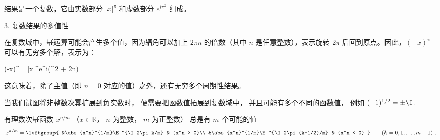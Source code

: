 结果是一个复数，它由实数部分 $|x|^\pi$ 和虚数部分 $e^{i\pi^2}$ 组成。

3. 复数结果的多值性

在复数域中，幂运算可能会产生多个值，因为辐角可以加上 $2\pi n$ 的倍数（其中 $n$ 是任意整数），表示旋转 $2\pi$ 后回到原点。因此，$(-x)^\pi$ 可以有无穷多个解，表示为：

(-x)^\pi = |x|^\pi \cdot e^{i(\pi^2 + 2n\pi)}

这意味着，除了主值（即 $n = 0$ 对应的值）之外，还有无穷多个周期性结果。



当我们试图将非整数次幂扩展到负实数时， 便需要把函数值拓展到复数域中， 并且可能有多个不同的函数值， 例如 $(-1)^{1/2} = \pm\I$. 

有理数次幂函数 $x^{n/m}$ （$x\in \mathbb R$， $n$ 为整数， $m$ 为正整数） 总是有 $m$ 个可能的值
\begin{equation}
x^{n/m} = \leftgroup{
&\abs{x^n}^{1/m}\E^{\I 2\pi k/m} & (x^n > 0)\\
&\abs{x^n}^{1/m}\E^{\I 2\pi (k+1/2)/m} & (x^n < 0)
}\qquad (k = 0,1,\dots, m-1)~.
\end{equation}